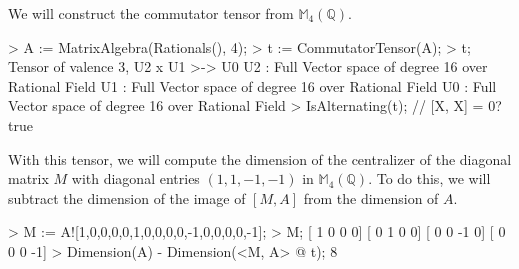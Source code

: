 \begin{example}[CommutatorFromAlgebra]

We will construct the commutator tensor from $\mathbb{M}_4(\mathbb{Q})$. 
\begin{code}
> A := MatrixAlgebra(Rationals(), 4);
> t := CommutatorTensor(A);
> t;
Tensor of valence 3, U2 x U1 >-> U0
U2 : Full Vector space of degree 16 over Rational Field
U1 : Full Vector space of degree 16 over Rational Field
U0 : Full Vector space of degree 16 over Rational Field
> IsAlternating(t); // [X, X] = 0?
true
\end{code}

With this tensor, we will compute the dimension of the centralizer of the
diagonal matrix $M$ with diagonal entries $(1,1,-1,-1)$ in
$\mathbb{M}_4(\mathbb{Q})$. To do this, we will subtract the dimension of the
image of $[M, A]$ from the dimension of $A$. 

\begin{code}
> M := A![1,0,0,0,0,1,0,0,0,0,-1,0,0,0,0,-1];
> M;
[ 1  0  0  0]
[ 0  1  0  0]
[ 0  0 -1  0]
[ 0  0  0 -1]
> Dimension(A) - Dimension(<M, A> @ t);
8
\end{code}
\end{example}

